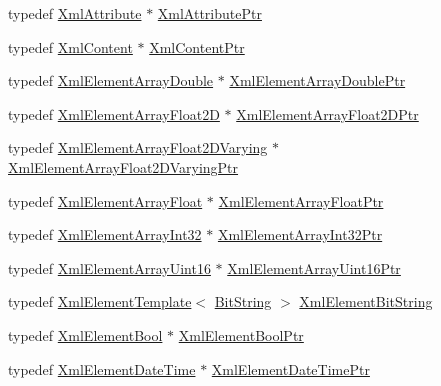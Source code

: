 \begin{DoxyCompactItemize}
\item 
typedef \hyperlink{class_k_k_b_1_1_xml_attribute}{Xml\+Attribute} $\ast$ \hyperlink{namespace_k_k_b_a4a5163ef82488376826c02944d6ef6c8}{Xml\+Attribute\+Ptr}
\item 
typedef \hyperlink{class_k_k_b_1_1_xml_content}{Xml\+Content} $\ast$ \hyperlink{namespace_k_k_b_a0ac08d955397a4ffcc62ce7aab18105f}{Xml\+Content\+Ptr}
\item 
typedef \hyperlink{class_k_k_b_1_1_xml_element_array_double}{Xml\+Element\+Array\+Double} $\ast$ \hyperlink{namespace_k_k_b_a890e530a492707fdf8f96e9e5122f211}{Xml\+Element\+Array\+Double\+Ptr}
\item 
typedef \hyperlink{class_k_k_b_1_1_xml_element_array_float2_d}{Xml\+Element\+Array\+Float2D} $\ast$ \hyperlink{namespace_k_k_b_a7a2268645924b20496fe73e4be0fe453}{Xml\+Element\+Array\+Float2\+D\+Ptr}
\item 
typedef \hyperlink{class_k_k_b_1_1_xml_element_array_float2_d_varying}{Xml\+Element\+Array\+Float2\+D\+Varying} $\ast$ \hyperlink{namespace_k_k_b_a060f57b7f2aa1fd4339d9b270e225df8}{Xml\+Element\+Array\+Float2\+D\+Varying\+Ptr}
\item 
typedef \hyperlink{class_k_k_b_1_1_xml_element_array_float}{Xml\+Element\+Array\+Float} $\ast$ \hyperlink{namespace_k_k_b_a0da7463a50a3050e027aab2bc7cbe47d}{Xml\+Element\+Array\+Float\+Ptr}
\item 
typedef \hyperlink{class_k_k_b_1_1_xml_element_array_int32}{Xml\+Element\+Array\+Int32} $\ast$ \hyperlink{namespace_k_k_b_a2adeb60bf20ebabd776bb452f5b08e51}{Xml\+Element\+Array\+Int32\+Ptr}
\item 
typedef \hyperlink{class_k_k_b_1_1_xml_element_array_uint16}{Xml\+Element\+Array\+Uint16} $\ast$ \hyperlink{namespace_k_k_b_a130cc537c7fef7de0b676ce72c079372}{Xml\+Element\+Array\+Uint16\+Ptr}
\item 
typedef \hyperlink{class_k_k_b_1_1_xml_element_template}{Xml\+Element\+Template}$<$ \hyperlink{class_k_k_b_1_1_bit_string}{Bit\+String} $>$ \hyperlink{namespace_k_k_b_a08eccbf7626d1c9bc414dce125921ce1}{Xml\+Element\+Bit\+String}
\item 
typedef \hyperlink{class_k_k_b_1_1_xml_element_bool}{Xml\+Element\+Bool} $\ast$ \hyperlink{namespace_k_k_b_af1a286924b8cff973d8b7d3d733a0a06}{Xml\+Element\+Bool\+Ptr}
\item 
typedef \hyperlink{class_k_k_b_1_1_xml_element_date_time}{Xml\+Element\+Date\+Time} $\ast$ \hyperlink{namespace_k_k_b_a60ee0bdbdc0be7118d94a0c84d156440}{Xml\+Element\+Date\+Time\+Ptr}
\item 

\end{DoxyCompactItemize}
